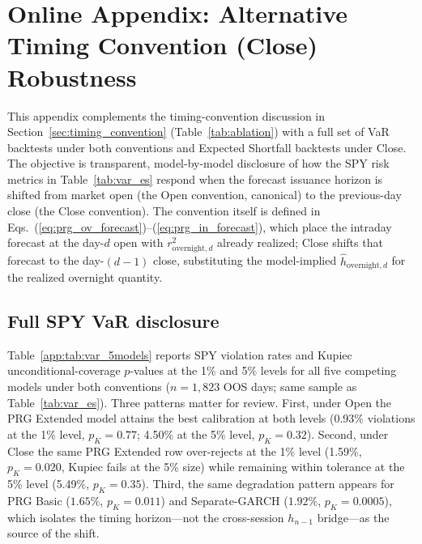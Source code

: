 \documentclass[11pt,a4paper]{article}
\begin{document}
\appendix
\section{Online Appendix: Alternative Timing Convention (Close) Robustness}
\label{app:k880v2_robustness}

This appendix complements the timing-convention discussion in
Section~\ref{sec:timing_convention} (Table~\ref{tab:ablation}) with a
full set of VaR backtests under both conventions and Expected Shortfall
backtests under Close. The objective is transparent, model-by-model
disclosure of how the SPY risk metrics in Table~\ref{tab:var_es} respond
when the forecast issuance horizon is shifted from market open (the Open
convention, canonical) to the previous-day close (the Close convention). The convention itself is
defined in Eqs.~(\ref{eq:prg_ov_forecast})--(\ref{eq:prg_in_forecast}),
which place the intraday forecast at the day-$d$ open with
$r^2_{\text{overnight},d}$ already realized; Close shifts that
forecast to the day-$(d{-}1)$ close, substituting the model-implied
$\hat h_{\text{overnight},d}$ for the realized overnight quantity.

\subsection*{Full SPY VaR disclosure}

Table~\ref{app:tab:var_5models} reports SPY violation rates and Kupiec
unconditional-coverage $p$-values at the 1\% and 5\% levels for all five
competing models under both conventions ($n = 1{,}823$ OOS days; same
sample as Table~\ref{tab:var_es}). Three patterns matter for review.
First, under Open the PRG Extended model attains the best calibration at
both levels (0.93\% violations at the 1\% level, $p_{K} = 0.77$;
4.50\% at the 5\% level, $p_{K} = 0.32$). Second, under Close the same
PRG Extended row over-rejects at the 1\% level (1.59\%, $p_{K} = 0.020$,
Kupiec fails at the 5\% size) while remaining within tolerance at the
5\% level (5.49\%, $p_{K} = 0.35$). Third, the same degradation pattern
appears for PRG Basic ($1.65\%$, $p_{K} = 0.011$) and Separate-GARCH
($1.92\%$, $p_{K} = 0.0005$), which isolates the timing horizon---not
the cross-session $h_{n-1}$ bridge---as the source of the shift.
\end{document}
